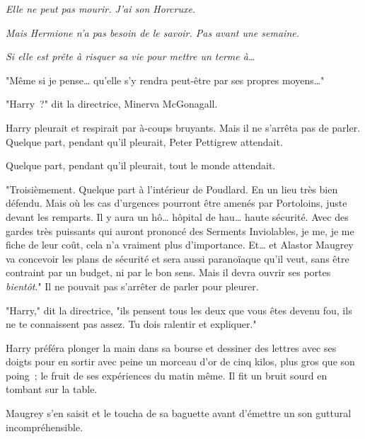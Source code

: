 \emph{Elle ne peut pas mourir. J'ai son Horcruxe.}

\emph{Mais Hermione n'a pas besoin de le savoir. Pas avant une semaine.}

\emph{Si elle est prête à risquer sa vie pour mettre un terme à…}

"Même si je pense… qu'elle s'y rendra peut-être par ses propres moyens…"

"Harry~?" dit la directrice, Minerva McGonagall.

Harry pleurait et respirait par à-coups bruyants. Mais il ne s'arrêta pas de parler. Quelque part, pendant qu'il pleurait, Peter Pettigrew attendait.

Quelque part, pendant qu'il pleurait, tout le monde attendait.

"Troisièmement. Quelque part à l'intérieur de Poudlard. En un lieu très bien défendu. Mais où les cas d'urgences pourront être amenés par Portoloins, juste devant les remparts. Il y aura un hô… hôpital de hau… haute sécurité. Avec des gardes très puissants qui auront prononcé des Serments Inviolables, je me, je me fiche de leur coût, cela n'a vraiment plus d'importance. Et… et Alastor Maugrey va concevoir les plans de sécurité et sera aussi paranoïaque qu'il veut, sans être contraint par un budget, ni par le bon sens. Mais il devra ouvrir ses portes \emph{bientôt}." Il ne pouvait pas s'arrêter de parler pour pleurer.

"Harry," dit la directrice, "ils pensent tous les deux que vous êtes devenu fou, ils ne te connaissent pas assez. Tu dois ralentir et expliquer."

Harry préféra plonger la main dans sa bourse et dessiner des lettres avec ses doigts pour en sortir avec peine un morceau d'or de cinq kilos, plus gros que son poing~; le fruit de ses expériences du matin même. Il fit un bruit sourd en tombant sur la table.

Maugrey s'en saisit et le toucha de sa baguette avant d'émettre un son guttural incompréhensible.

